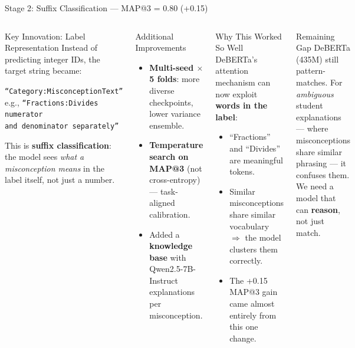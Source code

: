 \documentclass[aspectratio=169]{beamer}
\begin{document}
\begin{frame}{Stage 2: Suffix Classification --- MAP@3 = 0.80 \texorpdfstring{(+0.15)}{}}
\begin{columns}[T]
\begin{block}{Key Innovation: Label Representation}
Instead of predicting integer IDs, the target string became:
\begin{center}
\texttt{``Category:MisconceptionText''}\\[4pt]
e.g., \texttt{``Fractions:Divides numerator}\\
\texttt{and denominator separately''}
\end{center}
This is \textbf{suffix classification}: the model sees \textit{what a misconception means} in the label itself, not just a number.
\end{block}
\vspace{6pt}
\begin{block}{Additional Improvements}
\begin{itemize}
  \item \textbf{Multi-seed $\times$ 5 folds}: more diverse checkpoints, lower variance ensemble.
  \item \textbf{Temperature search on MAP@3} (not cross-entropy) --- task-aligned calibration.
  \item Added a \textbf{knowledge base} with Qwen2.5-7B-Instruct explanations per misconception.
\end{itemize}
\end{block}
\begin{exampleblock}{Why This Worked So Well}
DeBERTa's attention mechanism can now exploit \textbf{words in the label}:
\begin{itemize}
  \item ``Fractions'' and ``Divides'' are meaningful tokens.
  \item Similar misconceptions share similar vocabulary $\Rightarrow$ the model clusters them correctly.
  \item The +0.15 MAP@3 gain came almost entirely from this one change.
\end{itemize}
\end{exampleblock}
\vspace{6pt}
\begin{alertblock}{Remaining Gap}
DeBERTa (435M) still pattern-matches. For \textit{ambiguous} student explanations --- where misconceptions share similar phrasing --- it confuses them. We need a model that can \textbf{reason}, not just match.
\end{alertblock}
\end{columns}
\end{frame}
\end{document}
